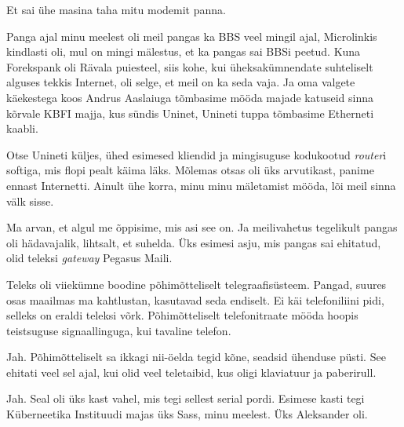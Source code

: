 
Et sai ühe masina taha  mitu modemit panna.


Panga ajal minu meelest oli meil pangas ka BBS veel mingil ajal, Microlinkis kindlasti oli, mul on mingi mälestus, et ka pangas sai BBSi peetud. Kuna Forekspank oli Rävala puiesteel, siis  kohe, kui üheksakümnendate suhteliselt alguses tekkis Internet, oli selge, et meil on ka seda vaja. Ja oma valgete käekestega koos Andrus Aaslaiuga tõmbasime mööda majade katuseid sinna kõrvale KBFI majja, kus sündis Uninet, Unineti tuppa tõmbasime Etherneti kaabli.

Otse Unineti küljes, ühed esimesed kliendid ja mingisuguse kodukootud \emph{router}i softiga, mis flopi pealt käima läks. Mõlemas otsas oli üks arvutikast, panime ennast Internetti. Ainult ühe korra, minu minu mäletamist mööda, lõi meil sinna välk sisse.


Ma arvan, et algul me õppisime, mis asi see on. Ja meilivahetus tegelikult pangas oli hädavajalik, lihtsalt, et  suhelda. Üks esimesi asju, mis pangas sai ehitatud, olid teleksi \emph{gateway} Pegasus Maili. 


Teleks oli viiekümne boodine põhimõtteliselt telegraafisüsteem. Pangad, suures osas maailmas ma kahtlustan, kasutavad seda endiselt. Ei käi telefoniliini pidi, selleks on eraldi teleksi võrk. Põhimõtteliselt telefonitraate mööda hoopis teistsuguse signaallinguga,  kui tavaline telefon.


Jah. Põhimõtteliselt sa ikkagi  nii-öelda tegid kõne, seadsid ühenduse püsti. See ehitati veel sel ajal, kui olid veel  teletaibid, kus oligi klaviatuur ja paberirull.


Jah. Seal oli üks kast vahel, mis tegi sellest serial pordi. Esimese kasti tegi Küberneetika Instituudi majas üks Sass, minu meelest. Üks Aleksander oli.


